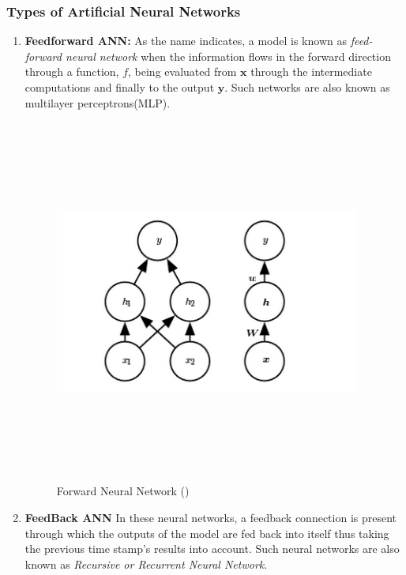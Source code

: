 \subsubsection{Types of Artificial Neural Networks}
\begin{enumerate}
	\item \textbf{Feedforward ANN:} 
	As the name indicates, a model is known as \textit{feed-forward neural network} when the information flows in the forward direction through a function, $f$, being evaluated from $\mathbf{x}$ through the intermediate computations and finally to the output $\mathbf{y}$. Such networks are also known as multilayer perceptrons(MLP). \\
	\begin{figure}[H]
		\centering
		\includegraphics[width=10cm,height=12cm,keepaspectratio]{files/feedForward.png}
		\caption{Forward Neural Network (\cite{Goodfellow-et-al-2016})}
		\label{fig:fnn}
	\end{figure}
	\item \textbf{FeedBack ANN}
	In these neural networks, a feedback connection is present through which the outputs of the model are fed back into itself thus taking the previous time stamp's results into account. Such neural networks are also known as \textit{Recursive or Recurrent Neural Network}.
	\begin{figure}[H]
		\centering

\end{figure}
\end{enumerate}
